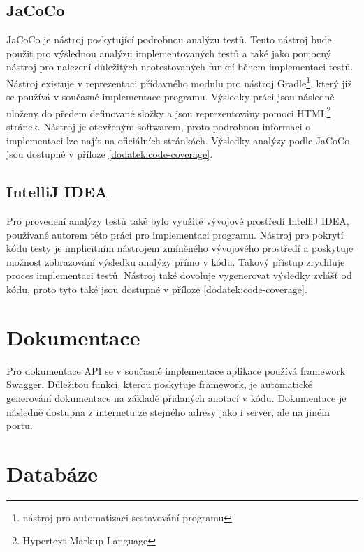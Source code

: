     \subsection{JaCoCo}\label{resere:testovani:jacoco}
        JaCoCo je nástroj poskytující podrobnou analýzu testů. Tento nástroj bude použit pro výslednou analýzu implementovaných testů a také jako pomocný nástroj pro nalezení důležitých neotestovaných funkcí během implementaci testů. Nástroj existuje v reprezentaci přídavného modulu pro nástroj Gradle\footnote{nástroj pro automatizaci sestavování programu}, který již se používá v současné implementace programu. Výsledky práci jsou následně uloženy do předem definované složky a jsou reprezentovány pomoci HTML\footnote{Hypertext Markup Language} stránek. Nástroj je otevřeným softwarem, proto podrobnou informaci o implementaci lze najít na oficiálních stránkách\cite{jacoco-implementation}. Výsledky analýzy podle JaCoCo jsou dostupné v příloze \ref{dodatek:code-coverage}.
        
    \subsection{IntelliJ IDEA}\label{resere:testovani:intellij-idea}
        Pro provedení analýzy testů také bylo využité vývojové prostředí IntelliJ IDEA, používané autorem této práci pro implementaci programu. Nástroj pro pokrytí kódu testy je implicitním nástrojem zmíněného vývojového prostředí a poskytuje možnost zobrazování výsledku analýzy přímo v kódu. Takový přístup zrychluje proces implementaci testů. Nástroj také dovoluje vygenerovat výsledky zvlášť od kódu, proto tyto také jsou dostupné v příloze \ref{dodatek:code-coverage}.


\section{Dokumentace}\label{resere:dokumentace}
    Pro dokumentace API se v současné implementace aplikace používá framework Swagger. Důležitou funkcí, kterou poskytuje framework, je automatické generování dokumentace na základě přidaných anotací v kódu. Dokumentace je následně dostupna z internetu ze stejného adresy jako i server, ale na jiném portu.
    
\section{Databáze}\label{resere:databaze}

